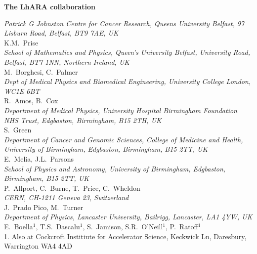 \vspace{0.75cm}
\begin{center}
  {\bf \color{BlueViolet} The LhARA collaboration} \\
  \vspace{0.25cm}
\end{center}
\noindent \textit{Patrick G Johnston Centre for Cancer Research, Queens University Belfast, 97 Lisburn Road, Belfast, BT9 7AE, UK} \\
K.M.~Prise \\
 
\noindent \textit{School of Mathematics and Physics, Queen's University Belfast, University Road, Belfast, BT7 1NN, Northern Ireland, UK} \\
M.~Borghesi, C.~Palmer \\
 
\noindent \textit{Dept of Medical Physics and Biomedical Engineering, University College London, WC1E 6BT} \\
R.~Amos, B.~Cox \\
 
\noindent \textit{Department of Medical Physics, University Hospital Birmingham Foundation NHS Trust, Edgbaston, Birmingham, B15 2TH, UK} \\
S.~Green \\
 
\noindent \textit{Department of Cancer and Genomic Sciences, College of Medicine and Health, University of Birmingham, Edgbaston, Birmingham, B15 2TT, UK} \\
E.~Melia, J.L.~Parsons \\
 
\noindent \textit{School of Physics and Astronomy, University of Birmingham, Edgbaston, Birmingham, B15 2TT, UK} \\
P.~Allport, C.~Burne, T.~Price, C.~Wheldon \\
 
\noindent \textit{CERN, CH-1211 Geneva 23, Switzerland} \\
J.~Prado Pico, M.~Turner \\
 
\noindent \textit{Department of Physics, Lancaster University, Bailrigg, Lancaster, LA1 4YW, UK} \\
E.~Boella$^{1}$, T.S.~Dascalu$^{1}$, S.~Jamison, S.R.~O'Neill$^{1}$, P.~Ratoff$^{1}$ \\
{\footnotesize
  1. Also at Cockcroft Institiute for Accelerator Science, Keckwick Ln, Daresbury, Warrington WA4 4AD \\
}
 
